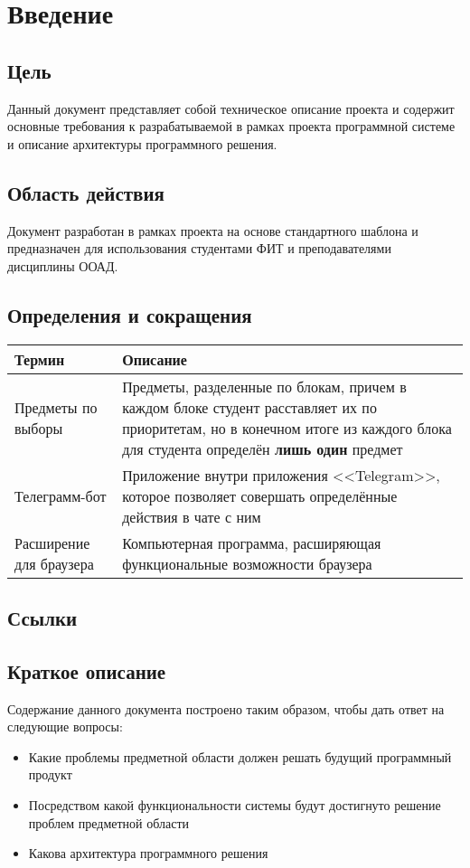 \chapter{Введение}
	\label{1}

	\section{Цель}
		Данный документ представляет собой техническое описание проекта \ProjectName и содержит основные требования к разрабатываемой в рамках проекта программной системе и описание архитектуры программного решения.
	\section{Область действия}
		Документ разработан в рамках проекта \ProjectName на основе стандартного шаблона и предназначен для использования студентами ФИТ и преподавателями дисциплины ООАД.
	\section{Определения и сокращения}
		\begin{tabularx}{\textwidth}{
				| >{\centering\arraybackslash\hsize=5cm}X
				| >{\centering\arraybackslash}X
				|}\hline
			\textbf{Термин} & \textbf{Описание} \\\hline
			Предметы по выборы & Предметы, разделенные по блокам, причем в каждом блоке студент расставляет их по приоритетам, но в конечном итоге из каждого блока для студента определён \textbf{лишь один} предмет \\\hline
			Телеграмм-бот & Приложение внутри приложения <<Telegram>>, которое позволяет совершать определённые действия в чате с ним \\\hline
			Расширение для браузера & Компьютерная программа, расширяющая функциональные возможности браузера \\\hline
		\end{tabularx}
	\section{Ссылки}

	\section{Краткое описание}
		Содержание данного документа построено таким образом, чтобы дать ответ на следующие вопросы:
		\begin{itemize}
			\item Какие проблемы предметной области должен решать будущий программный продукт
			
			\item Посредством какой функциональности системы будут достигнуто решение проблем предметной области
			
			\item Какова архитектура программного решения
		\end{itemize}
	
